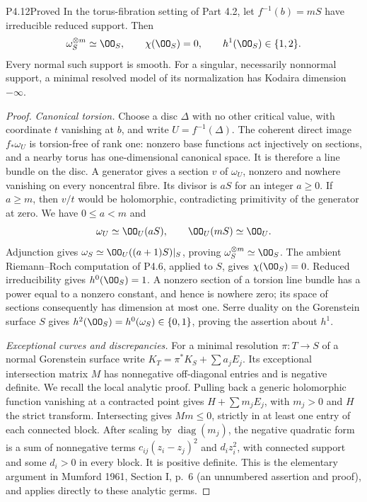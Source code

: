 \begin{statement}{P4.12}{Proved}
In the torus-fibration setting of Part 4.2, let $f^{-1}(b)=mS$
have irreducible reduced support. Then
\[
 \omega_S^{\otimes m}\simeq\OO_S,\qquad
 \chi(\OO_S)=0,\qquad h^1(\OO_S)\in\{1,2\}.
\]
Every normal such support is smooth. For a singular, necessarily
nonnormal support, a minimal resolved model of its normalization
has Kodaira dimension $-\infty$.
\end{statement}
\begin{proof}
\emph{Canonical torsion.}
Choose a disc $\Delta$ with no other critical value, with coordinate
$t$ vanishing at $b$, and write $U=f^{-1}(\Delta)$. The coherent
direct image $f_*\omega_U$ is torsion-free of rank one: nonzero
base functions act injectively on sections, and a nearby torus has
one-dimensional canonical space. It is therefore a line bundle
on the disc. A generator gives a section $v$ of $\omega_U$,
nonzero and nowhere vanishing on every noncentral fibre. Its
divisor is $aS$ for an integer $a\ge0$. If $a\ge m$, then $v/t$
would be holomorphic, contradicting primitivity of the generator
at zero. We have $0\le a<m$ and
\[
 \omega_U\simeq\OO_U(aS),\qquad\OO_U(mS)\simeq\OO_U.
\]
Adjunction gives $\omega_S\simeq\OO_U((a+1)S)|_S$, proving
$\omega_S^{\otimes m}\simeq\OO_S$. The ambient
Riemann--Roch computation of P4.6, applied to $S$, gives
$\chi(\OO_S)=0$. Reduced irreducibility gives $h^0(\OO_S)=1$.
A nonzero section of a torsion line bundle has a power equal to
a nonzero constant, and hence is nowhere zero; its space of
sections consequently has dimension at most one. Serre duality
on the Gorenstein surface $S$ gives
$h^2(\OO_S)=h^0(\omega_S)\in\{0,1\}$, proving the assertion
about $h^1$.

\emph{Exceptional curves and discrepancies.}
For a minimal resolution $\pi:T\to S$ of a normal Gorenstein
surface write $K_T=\pi^*K_S+\sum a_jE_j$. Its exceptional
intersection matrix $M$ has nonnegative off-diagonal entries
and is negative definite. We recall the local analytic proof.
Pulling back a generic holomorphic function vanishing at a
contracted point gives $H+\sum m_jE_j$, with $m_j>0$ and $H$
the strict transform. Intersecting gives $Mm\le0$, strictly in
at least one entry of each connected block. After scaling by
$\operatorname{diag}(m_j)$, the negative quadratic form is a
sum of nonnegative terms $c_{ij}(z_i-z_j)^2$ and $d_i z_i^2$,
with connected support and some $d_i>0$ in every block. It is
positive definite. This is the elementary argument in Mumford
1961, Section I, p.~6 (an unnumbered assertion and proof), and
applies directly to these analytic germs.


\end{proof}
